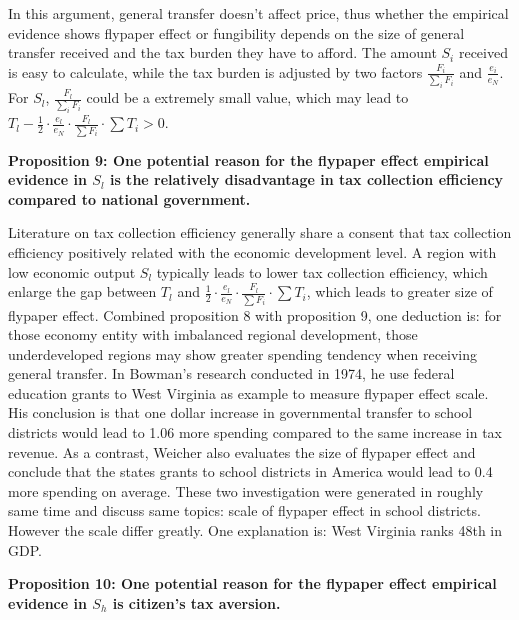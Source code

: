 In this argument, general transfer doesn't affect price, thus whether the empirical evidence shows flypaper effect or fungibility depends on the size of general transfer received and the tax burden they have to afford. The amount $S_i$ received is easy to calculate, while the tax burden is adjusted by two factors $\frac{F_i}{\sum_i F_i}$ and $\frac{e_i}{e_N}$. For $S_l$, $\frac{F_l}{\sum_i F_i}$ could be a extremely small value, which may lead to $T_l-\frac{1}{2}\cdot \frac{e_l}{e_N}\cdot \frac{F_l}{\sum F_i} \cdot \sum T_i>0$.

\textbf{Proposition 9: One potential reason for the flypaper effect empirical evidence in $S_l$ is the relatively disadvantage in tax collection efficiency compared to national government.}

Literature on tax collection efficiency generally share a consent that tax collection efficiency positively related with the economic development level\cite{arvate2008efficiency,mattos2011flypaper}. A region with low economic output $S_l$ typically leads to lower tax collection efficiency, which enlarge the gap between $T_l$ and $\frac{1}{2}\cdot \frac{e_l}{e_N}\cdot \frac{F_l}{\sum F_i} \cdot \sum T_i$, which leads to greater size of flypaper effect. Combined proposition 8 with proposition 9, one deduction is: for those economy entity with imbalanced regional development, those underdeveloped regions may show greater spending tendency when receiving general transfer. In Bowman's research conducted in 1974, he use federal education grants to West Virginia as example to measure flypaper effect scale\cite{bowman1974tax}. His conclusion is that one dollar increase in governmental transfer to school districts would lead to 1.06 more spending compared to the same increase in tax revenue. As a contrast, Weicher also evaluates the size of flypaper effect and conclude that the states grants to school districts in America would lead to 0.4 more spending on average\cite{weicher1972aid}. These two investigation were generated in roughly same time and discuss same topics: scale of flypaper effect in school districts. However the scale differ greatly. One explanation is: West Virginia ranks 48th in GDP.

\textbf{Proposition 10: One potential reason for the flypaper effect empirical evidence in $S_h$ is citizen's tax aversion.}

